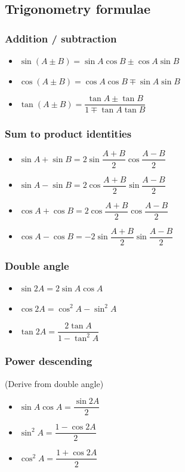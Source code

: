 \documentclass[A4paper]{article}
\begin{document}
	\subsection{Trigonometry formulae}
	\subsubsection{Addition / subtraction}
	\begin{itemize}
		\item $\sin (A \pm B) = \sin A \cos B \pm \cos A \sin B$
		\item $\cos (A \pm B) = \cos A \cos B \mp \sin A \sin B$
		\item $\tan (A \pm B) = \dfrac{\tan A \pm \tan B}{1 \mp \tan A \tan B}$
	\end{itemize}
	\subsubsection{Sum to product identities}
	\begin{itemize}
		\item $\sin A + \sin B = 2\sin \dfrac{A+B}{2} \cos\dfrac{A-B}{2}$
		\item $\sin A - \sin B = 2\cos \dfrac{A+B}{2} \sin\dfrac{A-B}{2}$
		\item $\cos A + \cos B = 2\cos \dfrac{A+B}{2} \cos\dfrac{A-B}{2}$
		\item $\cos A - \cos B = -2\sin \dfrac{A+B}{2} \sin\dfrac{A-B}{2}$
	\end{itemize}
	\subsubsection{Double angle}
	\begin{itemize}
		\item $\sin 2A = 2\sin A \cos A$
		\item $\cos 2A = \cos^2 A - \sin^2 A$
		\item $\tan 2A = \dfrac{2\tan A}{1-\tan^2 A}$
	\end{itemize}
	\subsubsection{Power descending}
	(Derive from double angle)
	\begin{itemize}
		\item $\sin A \cos A = \dfrac{\sin2A}{2}$
		\item $\sin^2 A = \dfrac{1-\cos2A}{2}$
		\item $\cos^2 A = \dfrac{1+\cos2A}{2}$
	\end{itemize}
\end{document}
